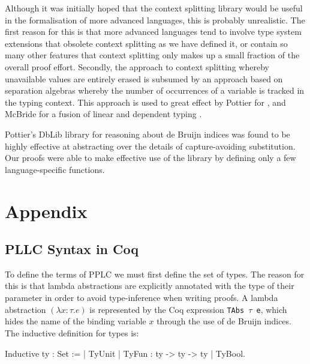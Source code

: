 \documentclass[]{unswthesis}
\newcommand{\SSPHS}{\text{SSPHS }}
\let\c\texttt
\begin{document}
Although it was initially hoped that the context splitting library would be useful in the formalisation of more advanced languages, this is probably unrealistic. The first reason for this is that more advanced languages tend to involve type system extensions that obsolete context splitting as we have defined it, or contain so many other features that context splitting only makes up a small fraction of the overall proof effort. Secondly, the approach to context splitting whereby unavailable values are entirely erased is subsumed by an approach based on separation algebras whereby the number of occurrences of a variable is tracked in the typing context. This approach is used to great effect by Pottier for \SSPHS \cite{pottier13}, and McBride for a fusion of linear and dependent typing \cite{mcbride16}.

Pottier's DbLib library for reasoning about de Bruijn indices was found to be highly effective at abstracting over the details of capture-avoiding substitution. Our proofs were able to make effective use of the library by defining only a few language-specific functions. %

\backmatter
\pagebreak



\chapter{Appendix}

\section{PLLC Syntax in Coq}
\label{app:pllc-syntax}

To define the terms of PPLC we must first define the set of types. The reason for this is that lambda abstractions are explicitly annotated with the type of their parameter in order to avoid type-inference when writing proofs. A lambda abstraction $(\lambda x : \tau. e)$ is represented by the Coq expression \c{TAbs $\tau$ e}, which hides the name of the binding variable $x$ through the use of de Bruijn indices. The inductive definition for types is:

\begin{coqcode}
Inductive ty : Set :=
  | TyUnit
  | TyFun : ty -> ty -> ty
  | TyBool.
\end{coqcode}
\end{document}
